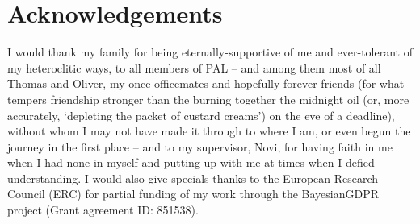 
\begingroup
\let\clearpage\relax
\let\cleardoublepage\relax
\let\cleardoublepage\relax
%
\chapter*{Acknowledgements}
%
I would thank my family for being eternally-supportive of me and ever-tolerant of my heteroclitic
ways, to all members of PAL -- and among them most of all Thomas and Oliver, my once officemates
and hopefully-forever friends (for what tempers friendship stronger than the burning together the
midnight oil (or, more accurately, `depleting the packet of custard creams') on the eve of a
deadline), without whom I may not have made it through to where I am, or even begun the journey in
the first place -- and to my supervisor, Novi, for having faith in me when I had none in myself and
putting up with me at times when I defied understanding.
%
I would also give specials thanks to the European Research Council (ERC) for partial funding of my
work through the BayesianGDPR project (Grant agreement ID: 851538).
%
\endgroup
